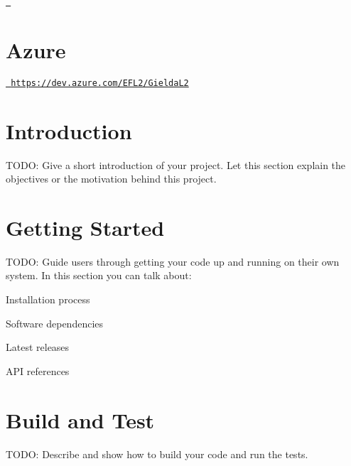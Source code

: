 \href{https://dev.azure.com/EFL2/GieldaL2/_build/latest?definitionId=5&branchName=master}{\texttt{ }} \section*{Azure}

\href{https://dev.azure.com/EFL2/GieldaL2}{\texttt{ https\+://dev.\+azure.\+com/\+E\+F\+L2/\+Gielda\+L2}}

\section*{Introduction}

T\+O\+DO\+: Give a short introduction of your project. Let this section explain the objectives or the motivation behind this project.

\section*{Getting Started}

T\+O\+DO\+: Guide users through getting your code up and running on their own system. In this section you can talk about\+:
\begin{DoxyEnumerate}
\item Installation process
\item Software dependencies
\item Latest releases
\item A\+PI references
\end{DoxyEnumerate}

\section*{Build and Test}

T\+O\+DO\+: Describe and show how to build your code and run the tests. 